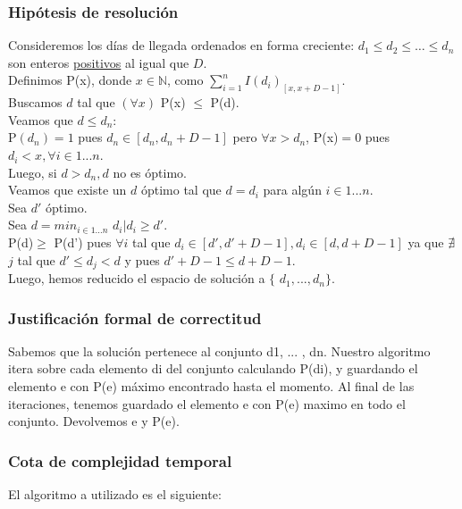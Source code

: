 \documentclass[11pt, a4paper, twoside]{article}
\begin{document}
\subsubsection{Hipótesis de resolución}
Consideremos los días de llegada ordenados en forma creciente: $d_1 \le d_2 \le \dots \le d_n$ son enteros \underline{positivos} al igual que $D$. \\
Definimos P(x), donde $x \in \mathbb{N}$, como $\sum_{i=1}^{n} I(d_i)_{[x,x+D-1]}$. \\
Buscamos $d$ tal que $(\forall x)$ P(x) $\le$ P(d). \\
Veamos que $d \le d_n$: \\
P$(d_n)=1$ pues $d_n \in [d_n,d_n + D - 1]$ pero $\forall x > d_n$, P(x)$=0$ pues $d_i < x, \forall i \in 1...n$.\\
Luego, si $d > d_n, d$ no es óptimo. \\
Veamos que existe un $d$ óptimo tal que $d=d_i$ para algún $i \in 1...n$. \\
Sea $d'$ óptimo. \\
Sea $d=min_{i \in 1...n}$ $d_i \big| d_i \ge d'$. \\
P(d)$\ge$ P(d') pues $\forall i$ tal que $d_i \in [d',d'+D-1], d_i \in [d,d+D-1]$ ya que $\nexists$ $j$ tal que $d' \le d_j < d$ y pues $d'+D-1 \le d+D-1$. \\
Luego, hemos reducido el espacio de solución a $\{$ $d_1,...,d_n$$\}$.

\subsubsection{Justificación formal de correctitud}
Sabemos que la solución pertenece al conjunto {d1, ... , dn}. Nuestro algoritmo itera sobre cada elemento di del conjunto calculando P(di), y guardando el elemento e con P(e) máximo encontrado hasta el momento. Al final de las iteraciones, tenemos guardado el elemento e con P(e) maximo en todo el conjunto. Devolvemos e y P(e).

\newpage
\subsubsection{Cota de complejidad temporal}
El algoritmo a utilizado es el siguiente:
\end{document}
